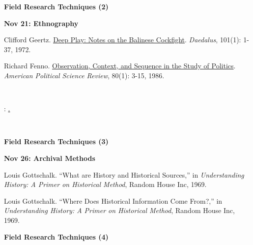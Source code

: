 \documentclass[letterpaper]{article}
\renewenvironment{itemize}{
  \begin{list}{}{
    \setlength{\leftmargin}{1.5em}
  }
}{
  \end{list}
}
\begin{document}
\begin{enumerate}
\item {\bf Field Research Techniques (2)}
		
		\begin{itemize}
		\item {\bf Nov 21: Ethnography}
			\begin{itemize}
				\item[$\bullet$] Clifford Geertz. \href{http://www.jstor.org/stable/20024056}{Deep Play: Notes on the Balinese Cockfight}. \emph{Daedalus}, 101(1): 1-37, 1972.  
				\item[$\bullet$] Richard Fenno. \href{http://www.jstor.org/stable/1957081}{Observation, Context, and Sequence in the Study of Politics}. \emph{American Political Science Review}, 80(1): 3-15, 1986. 
			\end{itemize}
		\end{itemize}

~\\
\item[] \begin{center}{\color{blue}{\bf Research Design Due}: \underline{{\unskip}.}}\end{center}
~\\

\item {\bf Field Research Techniques (3)}
		
		\begin{itemize}
		\item {\bf Nov 26: Archival Methods}
			\begin{itemize}
				\item[$\bullet$] Louis Gottschalk. ``What are History and Historical Sources,'' in \emph{Understanding History: A Primer on Historical Method}, Random House Inc, 1969.
				\item[$\bullet$] Louis Gottschalk. ``Where Does Historical Information Come From?,'' in \emph{Understanding History: A Primer on Historical Method}, Random House Inc, 1969. 
			\end{itemize}
		\end{itemize}


\item {\bf Field Research Techniques (4)}
		

\end{enumerate}
\end{document}
